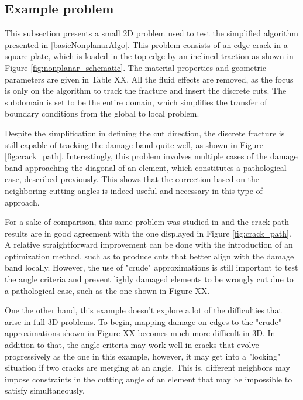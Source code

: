\subsection{Example problem}

This subsection presents a small 2D problem used to test the simplified algorithm presented in \ref{basicNonplanarAlgo}. This problem consists of an edge crack in a square plate, which is loaded in the top edge by an inclined traction as shown in Figure \ref{fig:nonplanar_schematic}. The material properties and geometric parameters are given in Table XX. All the fluid effects are removed, as the focus is only on the algorithm to track the fracture and insert the discrete cuts. The subdomain is set to be the entire domain, which simplifies the transfer of boundary conditions from the global to local problem. 

Despite the simplification in defining the cut direction, the discrete fracture is still capable of tracking the damage band quite well, as shown in Figure \ref{fig:crack_path}. Interestingly, this problem involves multiple cases of the damage band approaching the diagonal of an element, which constitutes a pathological case, described previously. This shows that the correction based on the neighboring cutting angles is indeed useful and necessary in this type of approach.

For a sake of comparison, this same problem was studied in \cite{giovanardi2017hybrid} and the crack path results are in good agreement with the one displayed in Figure \ref{fig:crack_path}. A relative straightforward improvement can be done with the introduction of an optimization method, such as \cite{geelen2018optimization} to produce cuts that better align with the damage band locally. However, the use of "crude" approximations is still important to test the angle criteria and prevent lighly damaged elements to be wrongly cut due to a pathological case, such as the one shown in Figure XX.

One the other hand, this example doesn't explore a lot of the difficulties that arise in full 3D problems. To begin, mapping damage on edges to the "crude" approximations shown in Figure XX becomes much more difficult in 3D. In addition to that, the angle criteria may work well in cracks that evolve progressively as the one in this example, however, it may get into a "locking" situation if two cracks are merging at an angle. This is, different neighbors may impose constraints in the cutting angle of an element that may be impossible to satisfy simultaneously. 

